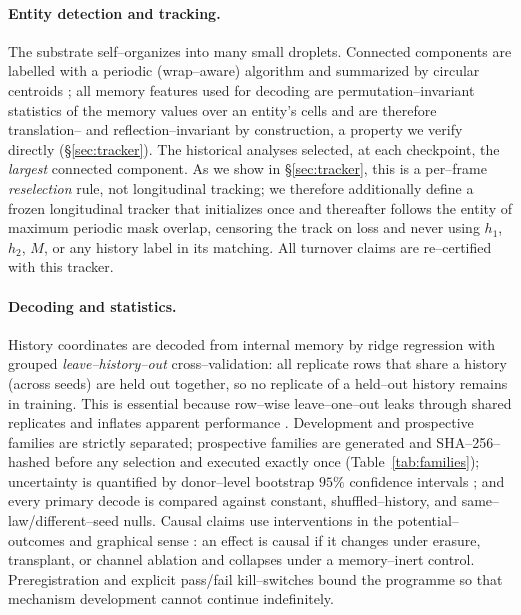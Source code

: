 \documentclass[11pt]{article}
\begin{document}
\paragraph{Entity detection and tracking.} The substrate self--organizes into many small droplets. Connected
components are labelled with a periodic (wrap--aware) algorithm and summarized by circular centroids
\citep{rosenfeld1966}; all memory features used for decoding are permutation--invariant statistics of the memory
values over an entity's cells and are therefore translation-- and reflection--invariant by construction, a property
we verify directly (\S\ref{sec:tracker}). The historical analyses selected, at each checkpoint, the \emph{largest}
connected component. As we show in \S\ref{sec:tracker}, this is a per--frame \emph{reselection} rule, not
longitudinal tracking; we therefore additionally define a frozen longitudinal tracker that initializes once and
thereafter follows the entity of maximum periodic mask overlap, censoring the track on loss and never using $h_1$,
$h_2$, $M$, or any history label in its matching. All turnover claims are re--certified with this tracker.

\paragraph{Decoding and statistics.} History coordinates are decoded from internal memory by ridge regression with
grouped \emph{leave--history--out} cross--validation: all replicate rows that share a history (across seeds) are
held out together, so no replicate of a held--out history remains in training. This is essential because row--wise
leave--one--out leaks through shared replicates and inflates apparent performance \citep{kaufman2012}. Development
and prospective families are strictly separated; prospective families are generated and SHA--256--hashed before any
selection and executed exactly once (Table~\ref{tab:families}); uncertainty is quantified by donor--level
bootstrap $95\%$ confidence intervals \citep{efron1979}; and every primary decode is compared against constant,
shuffled--history, and same--law/different--seed nulls. Causal claims use interventions in the potential--outcomes
and graphical sense \citep{rubin1974,pearl1995,pearl2009}: an effect is causal if it changes under erasure,
transplant, or channel ablation and collapses under a memory--inert control. Preregistration and explicit
pass/fail kill--switches \citep{nosek2018,popper1959} bound the programme so that mechanism development cannot
continue indefinitely.
\end{document}
